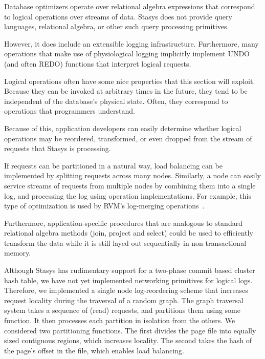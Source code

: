 \documentclass[letterpaper,twocolumn,10pt]{article}
\newcommand{\yad}{Stasys\xspace}
\begin{document}
Database optimizers operate over relational algebra expressions that
correspond to logical operations over streams of data.  \yad
does not provide query languages, relational algebra, or other such query processing primitives.  

However, it does include an extensible logging infrastructure.  Furthermore, many
operations that make use of physiological logging implicitly
implement UNDO (and often REDO) functions that interpret logical
requests.

Logical operations often have some nice properties that this section
will exploit.  Because they can be invoked at arbitrary times in the
future, they tend to be independent of the database's physical state.
Often, they correspond to operations that programmers understand.

Because of this, application developers can easily determine whether
logical operations may be reordered, transformed, or even
dropped from the stream of requests that \yad is processing.

If requests can be partitioned in a natural way, load
balancing can be implemented by splitting requests across many nodes.
Similarly, a node can easily service streams of requests from multiple
nodes by combining them into a single log, and processing the log
using operation implementations.  For example, this type of optimization 
is used by RVM's log-merging operations~\cite{lrvm}.

Furthermore, application-specific
procedures that are analogous to standard relational algebra methods
(join, project and select) could be used to efficiently transform the data
while it is still layed out sequentially
in non-transactional memory.


Although \yad has rudimentary support for a two-phase commit based
cluster hash table, we have not yet implemented networking primitives for logical logs.
Therefore, we implemented a single node log-reordering scheme that increases request locality
during the traversal of a random graph.  The graph traversal system
takes a sequence of (read) requests, and partitions them using some
function.  It then processes each partition in isolation from the
others.  We considered two partitioning functions.  The first divides the page file
into equally sized contiguous regions, which increases locality.  The second takes the hash
of the page's offset in the file, which enables load balancing.
\end{document}
